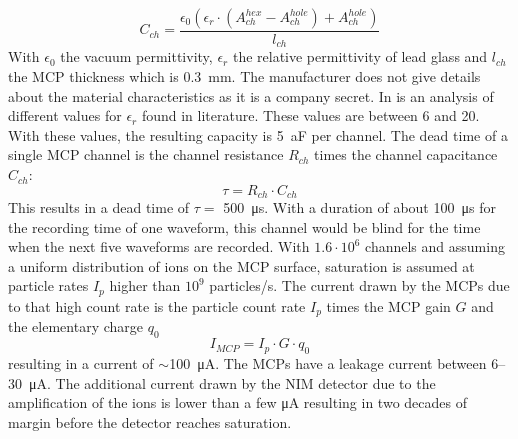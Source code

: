 	\begin{equation}
		C_{ch} = \frac{\epsilon_0  (\epsilon_r \cdot (A^{hex}_{ch} - A^{hole}_{ch})+ A^{hole}_{ch})}{l_{ch}}
	\end{equation}
	With $\epsilon_0$ the vacuum permittivity, $\epsilon_r$ the relative permittivity of lead glass and $l_{ch}$ the MCP thickness which is 0.3~mm. The manufacturer does not give details about the material characteristics as it is a company secret. In \cite{Diss_Neuland} is an analysis of different values for $\epsilon_r$ found in literature. These values are between 6 and 20. With these values, the resulting capacity is 5~\si{\atto\farad} per channel. The dead time of a single MCP channel is the channel resistance $R_{ch}$ times the channel capacitance $C_{ch}$:
	\begin{equation}
		\tau = R_{ch}\cdot C_{ch}
	\end{equation}
	This results in a dead time of $\tau =$ 500~\si{\micro\second}. With a duration of about 100~\si{\micro\second} for the recording time of one waveform, this channel would be blind for the time when the next five waveforms are recorded. With $1.6\cdot10^6$ channels and assuming a uniform distribution of ions on the MCP surface, saturation is assumed at particle rates $I_p$ higher than $10^9$ particles/\si{\second}. The current drawn by the MCPs due to that high count rate is the particle count rate $I_p$ times the MCP gain $G$ and the elementary charge $q_0$
	\begin{equation}
		I_{MCP} = I_p\cdot G \cdot q_0
	\end{equation}
	resulting in a current of $\sim$100~\si{\micro\ampere}. The MCPs have a leakage current between 6--30~\si{\micro\ampere}. The additional current drawn by the NIM detector due to the amplification of the ions is lower than a few \si{\micro\ampere} resulting in two decades of margin before the detector reaches saturation.
	
	
	
	

	
	





	